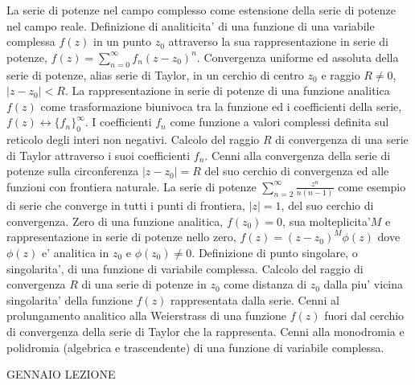 \documentclass[,12pt]{article}
\begin{document}
\noindent
La serie di potenze nel campo complesso come estensione della serie di
potenze nel campo reale. Definizione di analiticita' di una funzione di
una variabile complessa $f(z)$ in un punto $z_0$ attraverso la
sua rappresentazione in serie di potenze, $f(z)=\sum_{n=0}^\infty f_n
(z-z_0)^n$. Convergenza uniforme ed assoluta della serie di potenze,
alias serie di Taylor, in un cerchio di centro $z_0$ e raggio $R\neq 0$,
$|z-z_0|<R$. La rappresentazione in serie di potenze di una funzione
analitica
$f(z)$ come trasformazione biunivoca tra la funzione ed i coefficienti
della serie, $f(z)\leftrightarrow
\{f_n\}_{0}^\infty$. I coefficienti $f_n$ come funzione a valori
complessi definita sul reticolo degli interi non negativi. Calcolo del
raggio
$R$ di convergenza di una serie di Taylor attraverso i suoi coefficienti
$f_n$. Cenni alla convergenza della serie di potenze sulla circonferenza
$|z-z_0|=R$ del suo cerchio di convergenza ed alle funzioni con frontiera
naturale. La serie  di potenze $\sum_{n=2}^\infty \frac{z^n}{n(n-1)}$
come esempio di serie che converge in tutti i punti di frontiera, $|z|=1$,
del suo cerchio di convergenza. Zero di una funzione analitica,
$f(z_0)=0$, sua molteplicita'$M$ e rappresentazione in serie di potenze
nello zero, $f(z)=(z-z_0)^M \phi(z)$ dove $\phi(z)$ e' analitica in $z_0$
e $\phi(z_0)\neq 0$. Definizione di punto singolare, o singolarita', di
una funzione di variabile complessa. Calcolo del raggio di convergenza
$R$ di una serie di potenze in $z_0$ come distanza di $z_0$ dalla piu'
vicina singolarita' della funzione $f(z)$ rappresentata dalla serie.
Cenni al prolungamento analitico alla Weierstrass di una funzione $f(z)$
fuori dal cerchio di convergenza della serie di Taylor che la
rappresenta. Cenni alla monodromia e polidromia (algebrica e
trascendente) di una funzione di variabile complessa.

\vskip 20pt
 GENNAIO
\hskip 20pt
LEZIONE
\end{document}
